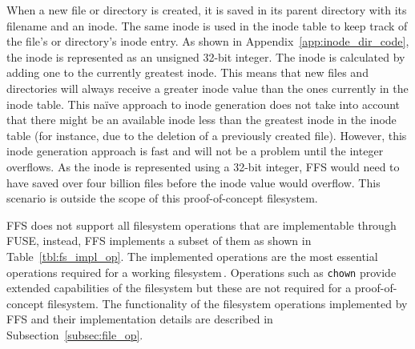 When a new file or directory is created, it is saved in its parent directory with its filename and an inode. The same inode is used in the inode table to keep track of the file's or directory's inode entry. As shown in Appendix~\ref{app:inode_dir_code}, the inode is represented as an unsigned \mbox{32-bit} integer. The inode is calculated by adding one to the currently greatest inode. This means that new files and directories will always receive a greater inode value than the ones currently in the inode table. This naïve approach to inode generation does not take into account that there might be an available inode less than the greatest inode in the inode table (for instance, due to the deletion of a previously created file). However, this inode generation approach is fast and will not be a problem until the integer overflows. As the inode is represented using a \mbox{32-bit} integer, \gls{FFS} would need to have saved over four billion files before the inode value would overflow. This scenario is outside the scope of this \mbox{proof-of-concept} filesystem.

\gls{FFS} does not support all filesystem operations that are implementable through \gls{FUSE}, instead, \gls{FFS} implements a subset of them as shown in Table~\ref{tbl:fs_impl_op}. The implemented operations are the most essential operations required for a working filesystem\,\cite{kuenningCS135FUSEDocumentation2010}. Operations such as \texttt{chown} provide extended capabilities of the filesystem but these are not required for a \mbox{proof-of-concept} filesystem. The functionality of the filesystem operations implemented by \gls{FFS} and their implementation details are described in Subsection~\ref{subsec:file_op}. 

